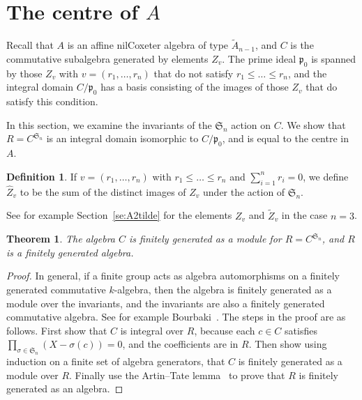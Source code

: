 \documentclass[12pt]{amsart}
\renewcommand{\le}{\leqslant}
\newcommand{\sym}[1]{\mathfrak{S}_{#1}}
\newcommand{\mfp}{\mathfrak{p}}
\numberwithin{equation}{section}
\newtheorem{theorem}[equation]{Theorem}
\theoremstyle{definition}
\newtheorem{definition}[equation]{Definition}
\begin{document}
\section{\texorpdfstring{The centre of $A$}{The centre of A}}\label{se:centre}

Recall that $A$ is an affine nilCoxeter algebra of type $\tilde
A_{n-1}$, and $C$ is the commutative subalgebra generated by elements
$Z_v$. The prime ideal $\mfp_0$ is spanned by those $Z_v$ with
$v=(r_1,\dots,r_n)$ that do not satisfy $r_1\le \dots\le r_n$, and the
integral domain $C/\mfp_0$ has a basis consisting of the images of those $Z_v$ that do
satisfy this condition.

In this section, we examine the invariants of the $\sym{n}$ action on
$C$. We show that $R=C^{\sym{n}}$ is an integral domain isomorphic to
  $C/\mfp_0$, and is equal to the centre in $A$. 


\begin{definition}
If $v=(r_1,\dots,r_n)$ with $r_1\le \dots \le r_n$ and $\sum_{i=1}^nr_i=0$, we define 
$\hat Z_v$ to be the sum of the distinct images of $Z_v$ under the
action of $\sym{n}$.
\end{definition}

See for example Section~\ref{se:A2tilde} for the elements $Z_v$ and
$\tilde Z_v$ in the case $n=3$.


\begin{theorem}\label{th:Cfg/Csigma}
The algebra $C$ is finitely generated as a module for $R=C^{\sym{n}}$,
and $R$ is a finitely generated algebra.
\end{theorem}
\begin{proof}
In general, if a finite group acts as algebra automorphisms on a
finitely generated commutative 
$k$-algebra, then the algebra is finitely generated as a module over
the invariants, and the invariants are also a
finitely generated commutative algebra.
See for example 
Bourbaki~\cite[Ch.~V, \S1, no.~9, Theorem~2]{Bourbaki:1985a}.
The steps in the proof are as follows. First show that $C$ is integral over
$R$, because each $c\in C$ satisfies
$\prod_{\sigma\in\sym{n}}(X-\sigma(c))=0$, and the coefficients are in
$R$. 
Then show using induction on a finite set of algebra
generators, that $C$ is finitely generated as a module over
$R$. Finally use the Artin--Tate
lemma~\cite[Theorem~1]{Artin/Tate:1951a} to prove that 
$R$ is finitely generated as an algebra.
\end{proof}
\end{document}
